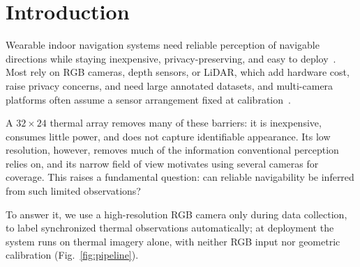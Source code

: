 \section{Introduction}

Wearable indoor navigation systems need reliable perception of navigable
directions while staying inexpensive, privacy-preserving, and easy to
deploy~\cite{yuNaVIPComputerVisionBased2026}. Most rely on RGB cameras, depth
sensors, or LiDAR, which add hardware cost, raise privacy concerns, and need
large annotated datasets, and multi-camera platforms often assume a sensor
arrangement fixed at calibration~\cite{kuoRedesigningSLAMArbitrary2020}.



A $32\times24$ thermal array removes many of these barriers: it is
inexpensive, consumes little power, and does not capture identifiable
appearance. Its low resolution, however, removes much of the information
conventional perception relies on, and its narrow field of view motivates
using several cameras for coverage. This raises a fundamental question: can
reliable navigability be inferred from such limited observations?



To answer it, we use a high-resolution RGB camera only during data
collection, to label synchronized thermal observations automatically; at
deployment the system runs on thermal imagery
alone, with neither RGB input nor geometric calibration
(Fig.~\ref{fig:pipeline}).



